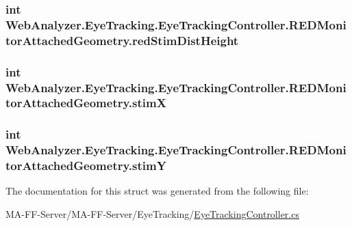 \subsubsection[{red\+Stim\+Dist\+Height}]{\setlength{\rightskip}{0pt plus 5cm}int Web\+Analyzer.\+Eye\+Tracking.\+Eye\+Tracking\+Controller.\+R\+E\+D\+Monitor\+Attached\+Geometry.\+red\+Stim\+Dist\+Height}\label{struct_web_analyzer_1_1_eye_tracking_1_1_eye_tracking_controller_1_1_r_e_d_monitor_attached_geometry_af61588e67a4886a43bf75e828aba6c26}
\hypertarget{struct_web_analyzer_1_1_eye_tracking_1_1_eye_tracking_controller_1_1_r_e_d_monitor_attached_geometry_afa74843ca98b6917acf93ae7eb33e788}{}
\subsubsection[{stim\+X}]{\setlength{\rightskip}{0pt plus 5cm}int Web\+Analyzer.\+Eye\+Tracking.\+Eye\+Tracking\+Controller.\+R\+E\+D\+Monitor\+Attached\+Geometry.\+stim\+X}\label{struct_web_analyzer_1_1_eye_tracking_1_1_eye_tracking_controller_1_1_r_e_d_monitor_attached_geometry_afa74843ca98b6917acf93ae7eb33e788}
\hypertarget{struct_web_analyzer_1_1_eye_tracking_1_1_eye_tracking_controller_1_1_r_e_d_monitor_attached_geometry_a46c7e6958d80fe749b8df93404a9bbc5}{}
\subsubsection[{stim\+Y}]{\setlength{\rightskip}{0pt plus 5cm}int Web\+Analyzer.\+Eye\+Tracking.\+Eye\+Tracking\+Controller.\+R\+E\+D\+Monitor\+Attached\+Geometry.\+stim\+Y}\label{struct_web_analyzer_1_1_eye_tracking_1_1_eye_tracking_controller_1_1_r_e_d_monitor_attached_geometry_a46c7e6958d80fe749b8df93404a9bbc5}


The documentation for this struct was generated from the following file\+:\begin{DoxyCompactItemize}
\item 
M\+A-\/\+F\+F-\/\+Server/\+M\+A-\/\+F\+F-\/\+Server/\+Eye\+Tracking/\hyperlink{_eye_tracking_controller_8cs}{Eye\+Tracking\+Controller.\+cs}\end{DoxyCompactItemize}
